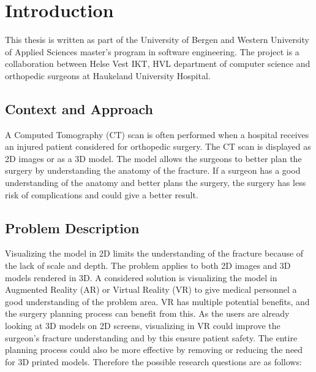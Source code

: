 \documentclass[a4paper]{report}
\begin{document}

\pagebreak
\tableofcontents
\listoffigures


\chapter{Introduction}
This thesis is written as part of the University of Bergen and Western University of Applied Sciences master's program in software engineering. The project is a collaboration between Helse Vest IKT, HVL department of computer science and orthopedic surgeons at Haukeland University Hospital.

\section{Context and Approach}
A Computed Tomography (CT) scan is often performed when a hospital receives an injured patient considered for orthopedic surgery. The CT scan is displayed as 2D images or as a 3D model. The model allows the surgeons to better plan the surgery by understanding the anatomy of the fracture.
If a surgeon has a good understanding of the anatomy and better plans the surgery,
the surgery has less risk of complications and could give a better result.

\section{Problem Description}
Visualizing the model in 2D limits the understanding of the fracture because of the lack of scale and depth. The problem applies to both 2D images and 3D models rendered in 3D.
A considered solution is visualizing the model in Augmented Reality (AR) or Virtual Reality (VR) to give medical personnel a good understanding of the problem area.
VR has multiple potential benefits, and the surgery planning process can benefit from this. As the users are already looking at 3D models on 2D screens, visualizing in VR could improve the surgeon's fracture understanding and by this ensure patient safety. The entire planning process could also be more effective by removing or reducing the need for 3D printed models.
Therefore the possible research questions are as follows:
\end{document}
